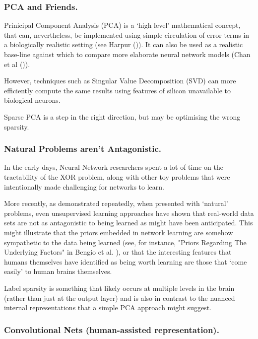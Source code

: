 \documentclass[citeauthoryear]{llncs}
\begin{document}
\subsubsection*{PCA and Friends.}

Prinicipal Component Analysis (PCA) is a `high level' mathematical concept, 
that can, nevertheless, be implemented using simple circulation of error terms
in a biologically realistic setting (see Harpur (\cite{harpur-thesis})).
It can also be used as a realistic base-line against which to compare more
elaborate neural network models (Chan et al (\cite{PCAnet})).

However, techniques such as Singular Value Decomposition (SVD) can more 
efficiently compute the same results using features of silicon unavailable to biological neurons.

Sparse PCA is a step in the right direction, but may be optimising the wrong sparsity.
 

\subsubsection*{Natural Problems aren't Antagonistic.}

In the early days, Neural Network researchers spent a lot of time on the 
tractability of the XOR problem, along with other toy problems that were 
intentionally made challenging for networks to learn.

More recently, as demonstrated repeatedly, when presented with `natural' problems, 
even unsupervised learning approaches have shown that real-world data sets 
are not as antagonistic to being learned as might have been anticipated.  
This might illustrate that the priors embedded in network learning are 
somehow sympathetic to the data being learned 
(see, for instance, "Priors Regarding The Underlying Factors" in Bengio et al. \cite{Bengio-et-al-2014-Book}),
or that the interesting features that humans themselves have identified as being 
worth learning are those that `come easily' to human brains themselves.

Label sparsity is something that likely occurs at multiple levels in the brain 
(rather than just at the output layer) and is also in contrast to the 
nuanced internal representations that a simple PCA approach might suggest.


\subsubsection*{Convolutional Nets (human-assisted representation).}
\end{document}
